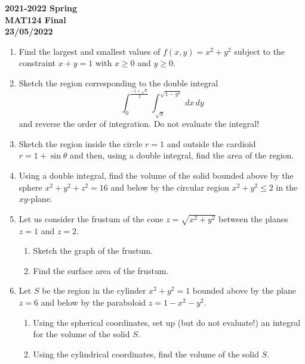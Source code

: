 \documentclass[a4paper, 12pt]{article}
\begin{document}
\newpage
{}
{}

\begin{center}
\textbf{2021-2022 Spring \\MAT124 Final\\23/05/2022}
\end{center}

\begin{enumerate}[leftmargin=*,label=\textbf{\arabic*.}]
\item Find the largest and smallest values of $f(x,y) = x^2+y^2$ subject to the constraint $x+y=1$ with $x\geq0$ and $y\geq0$.

\item Sketch the region corresponding to the double integral
\[\int_0^{\frac{-1+\sqrt5}{2}}\int_{\sqrt{y}}^{\sqrt{1-y^2}}\,dx\,dy\]
and reverse the order of integration. Do not evaluate the integral!

\item Sketch the region inside the circle $r=1$ and outside the cardioid $r=1+\sin\theta$ and then, using a double integral, find the area of the region.

\item Using a double integral, find the volume of the solid bounded above by the sphere $x^2+y^2+z^2 = 16$ and below by the circular region $x^2+y^2\leq2$ in the $xy$-plane.

\item Let us consider the frustum of the cone $z=\sqrt{x^2+y^2}$ between the planes $z=1$ and $z=2$.

\begin{enumerate}[leftmargin=*,label=\textbf{\alph*.}]
\item Sketch the graph of the frustum.
\item Find the surface area of the frustum.
\end{enumerate}

\item Let $S$ be the region in the cylinder $x^2+y^2 = 1$ bounded above by the plane $z=6$ and below by the paraboloid $z=1-x^2-y^2$.

\begin{enumerate}[leftmargin=*,label=\textbf{\alph*.}]
\item Using the spherical coordinates, set up (but do not evaluate!) an integral for the volume of the solid $S$.
\item Using the cylindrical coordinates, find the volume of the solid $S$.
\end{enumerate}
\end{enumerate}
\end{document}
